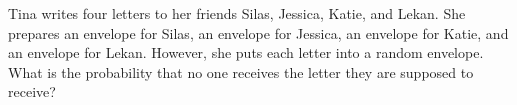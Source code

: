 Tina writes four letters to her friends Silas, Jessica, Katie, and Lekan. She prepares an envelope for Silas, an envelope for Jessica, an envelope for Katie, and an envelope for Lekan. However, she puts each letter into a random envelope. What is the probability that no one receives the letter they are supposed to receive?
